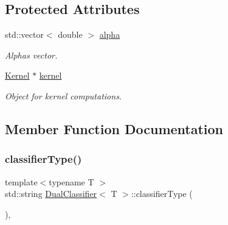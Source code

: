 \subsection*{Protected Attributes}
\begin{DoxyCompactItemize}
\item 
\mbox{\label{class_dual_classifier_a204d0e925be1450c97dd8635b8c9f3e9}} 
std\+::vector$<$ double $>$ \hyperlink{class_dual_classifier_a204d0e925be1450c97dd8635b8c9f3e9}{alpha}
\begin{DoxyCompactList}\small\item\em Alphas vector. \end{DoxyCompactList}\item 
\mbox{\label{class_dual_classifier_a40c32ed2991c8545d50ef5fe57611c28}} 
\hyperlink{class_kernel}{Kernel} $\ast$ \hyperlink{class_dual_classifier_a40c32ed2991c8545d50ef5fe57611c28}{kernel}
\begin{DoxyCompactList}\small\item\em Object for kernel computations. \end{DoxyCompactList}\end{DoxyCompactItemize}


\subsection{Member Function Documentation}
\mbox{\label{class_dual_classifier_af1217d4b44e417817a25157bb3f9b6d9}} 
\subsubsection{\texorpdfstring{classifier\+Type()}{classifierType()}}
{\footnotesize\ttfamily template$<$typename T $>$ \\
std\+::string \hyperlink{class_dual_classifier}{Dual\+Classifier}$<$ T $>$\+::classifier\+Type (\begin{DoxyParamCaption}{ }\end{DoxyParamCaption})\hspace{0.3cm}{\ttfamily [inline]}, {\ttfamily [virtual]}}




